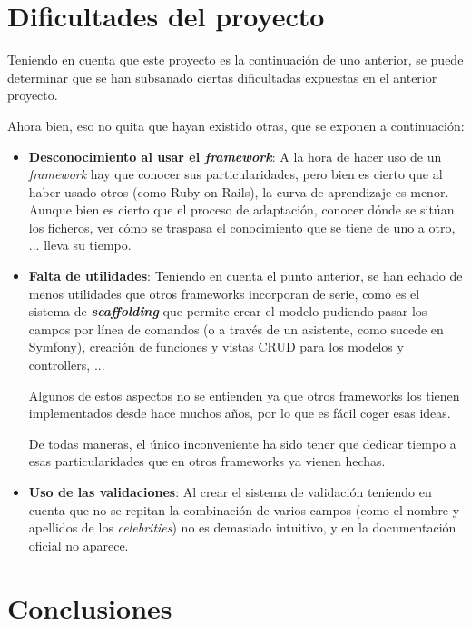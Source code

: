 \documentclass{\ClassPath/viu-tfm-template}
\begin{document}
\chapter{Dificultades del proyecto}

Teniendo en cuenta que este proyecto es la continuación de uno anterior, se puede determinar que se han subsanado ciertas dificultadas expuestas en el anterior proyecto.

Ahora bien, eso no quita que hayan existido otras, que se exponen a continuación:

\vspace{-1em}
\begin{itemize}
    \item \textbf{Desconocimiento al usar el \textit{framework}}: A la hora de hacer uso de un \textit{framework} hay que conocer sus particularidades, pero bien es cierto que al haber usado otros (como Ruby on Rails), la curva de aprendizaje es menor. Aunque bien es cierto que el proceso de adaptación, conocer dónde se sitúan los ficheros, ver cómo se traspasa el conocimiento que se tiene de uno a otro, ... lleva su tiempo.
    \item \textbf{Falta de utilidades}: Teniendo en cuenta el punto anterior, se han echado de menos utilidades que otros frameworks incorporan de serie, como es el sistema de \textit{\textbf{scaffolding}} que permite crear el modelo pudiendo pasar los campos por línea de comandos (o a través de un asistente, como sucede en Symfony), creación de funciones y vistas CRUD para los modelos y controllers, ...

    Algunos de estos aspectos no se entienden ya que otros frameworks los tienen implementados desde hace muchos años, por lo que es fácil coger esas ideas.

    De todas maneras, el único inconveniente ha sido tener que dedicar tiempo a esas particularidades que en otros frameworks ya vienen hechas.

    \item \textbf{Uso de las validaciones}: Al crear el sistema de validación teniendo en cuenta que no se repitan la combinación de varios campos (como el nombre y apellidos de los \textit{celebrities}) no es demasiado intuitivo, y en la documentación oficial no aparece.
\end{itemize}
\vspace{-1em}


\chapter{Conclusiones}
\end{document}
